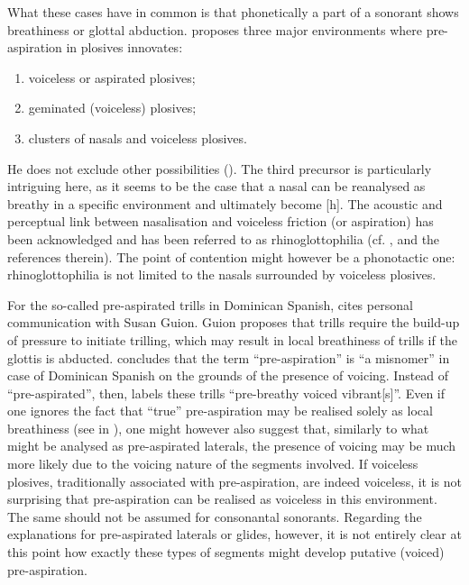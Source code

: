 \documentclass[output=paper]{langscibook}
\begin{document}
What these cases have in common is that phonetically a part of a sonorant shows breathiness or glottal abduction. \citet{Clayton2010} proposes three major environments where pre\hyp aspiration in plosives innovates: 

\begin{enumerate}
\item  voiceless or aspirated plosives;
\item geminated (voiceless) plosives;
\item clusters of nasals and voiceless plosives.
\end{enumerate}

He does not exclude other possibilities (\citeyear[74--75]{Clayton2010}). The third precursor is particularly intriguing here, as it seems to be the case that a nasal can be reanalysed as breathy in a specific environment and ultimately become [h]. The acoustic and perceptual link between nasalisation and voiceless friction (or aspiration) has been acknowledged and has been referred to as rhinoglottophilia (cf. \citealt{Matisoff1975, GarellekEtAl2016}, and the references therein). The point of contention might however be a phonotactic one: rhinoglottophilia is not limited to the nasals surrounded by voiceless plosives.

For the so-called pre-aspirated trills in Dominican Spanish, \citet[46]{Willis2007} cites personal communication with Susan Guion. Guion proposes that trills require the build-up of pressure to initiate trilling, which may result in local breathiness of trills if the glottis is abducted. \citet[45]{Willis2007} concludes that the term “pre-aspiration” is “a misnomer” in case of Dominican Spanish on the grounds of the presence of voicing. Instead of “pre-aspirated”, then, \citet[46]{Willis2007} labels these trills “pre-breathy voiced vibrant[s]”. Even if one ignores the fact that “true” pre\hyp aspiration may be realised solely as local breathiness (see  in ), one might however also suggest that, similarly to what might be analysed as pre-aspirated laterals, the presence of voicing may be much more likely due to the voicing nature of the segments involved. If voiceless plosives, traditionally associated with pre-aspiration, are indeed voiceless, it is not surprising that pre\hyp aspiration can be realised as voiceless in this environment. The same should not be assumed for consonantal sonorants. Regarding the explanations for pre-aspirated laterals or glides, however, it is not entirely clear at this point how exactly these types of segments might develop putative (voiced) pre-aspiration.
\end{document}
